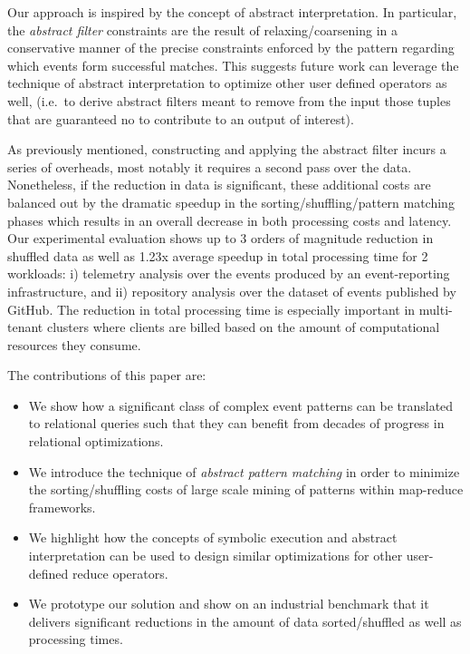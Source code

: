  
Our approach is inspired by the concept of abstract interpretation.  In
particular, the {\em abstract filter} constraints are the result of
relaxing/coarsening in a conservative manner of the precise constraints enforced
by the pattern regarding which events form successful matches.  This suggests
future work can leverage the technique of abstract interpretation to optimize
other user defined operators as well, (i.e.\ to derive abstract filters meant to
remove from the input those tuples that are guaranteed no to contribute to an
output of interest).


As previously mentioned, constructing and applying the abstract filter incurs a
series of overheads, most notably it requires a second pass over the data.
Nonetheless, if the reduction in data is significant, these additional costs are
balanced out by the dramatic speedup in the sorting/shuffling/pattern matching
phases which results in an overall decrease in both processing costs and
latency.  Our experimental evaluation shows up to 3 orders of magnitude
reduction in shuffled data as well as 1.23x average speedup in total processing
time for 2 workloads: i) telemetry analysis over the events produced by an
event-reporting infrastructure, and ii) repository analysis over the dataset of
events published by GitHub.  The reduction in total processing time is
especially important in multi-tenant clusters where clients are billed based on
the amount of computational resources they consume.

The contributions of this paper are:
\begin{itemize}
	\item We show how a significant class of complex event patterns can be 
	translated to relational queries such that they can benefit from decades of 
	progress in relational optimizations.
	\item We introduce the technique of {\em abstract pattern matching} in 
	order to minimize the sorting/shuffling costs of large scale mining of 
	patterns within map-reduce frameworks.
	\item We highlight how the concepts of symbolic execution and abstract 
	interpretation can be used to design similar optimizations for other 
	user-defined reduce operators.
	\item We prototype our solution and show on an industrial benchmark that 
	it delivers significant reductions in the amount of data sorted/shuffled as 
	well as processing times.  
\end{itemize}


